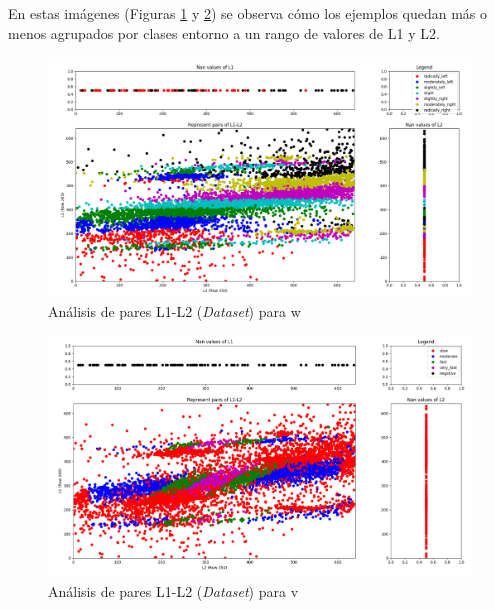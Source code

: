En estas imágenes (Figuras \ref{fig.L1_L2_dataset_w} y \ref{fig.L1_L2_dataset_v}) se observa cómo los ejemplos quedan más o menos agrupados por clases entorno a un rango de valores de L1 y L2. \\

\begin{figure}[H]
  \begin{center}
    \includegraphics[width=1\textwidth]{figures/Infraestructura/L1_L2_dataset3_w.png}
		\caption{Análisis de pares L1-L2 (\textit{Dataset}) para w}
		\label{fig.L1_L2_dataset_w}
		\end{center}
\end{figure}

\begin{figure}[H]
  \begin{center}
    \includegraphics[width=1\textwidth]{figures/Infraestructura/L1_L2_dataset3_v.png}
		\caption{Análisis de pares L1-L2 (\textit{Dataset}) para v}
		\label{fig.L1_L2_dataset_v}
		\end{center}
\end{figure}


